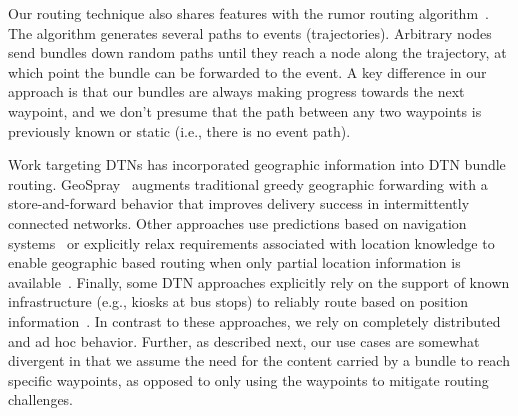 Our routing technique also shares features with the rumor routing algorithm~\cite{braginsky02:RRA}. The algorithm generates several paths to events (trajectories). Arbitrary nodes send bundles down random paths until they reach a node along the trajectory, at which point the bundle can be forwarded to the event. A key difference in our approach is that our bundles are always making progress towards the next waypoint, and we don't presume that the path between any two waypoints is previously known or static (i.e., there is no event path).

Work targeting DTNs has incorporated geographic information into DTN bundle routing. GeoSpray~\cite{soares14:geospray} augments traditional greedy geographic forwarding with a store-and-forward behavior that improves delivery success in intermittently connected networks. Other approaches use predictions based on navigation systems~\cite{cheng10:geodtn} or explicitly relax requirements associated with location knowledge to enable geographic based routing when only partial location information is available~\cite{kuiper11:geographical}. Finally, some DTN approaches explicitly rely on the support of known infrastructure (e.g., kiosks at bus stops) to reliably route based on position information~\cite{park12:position}. In contrast to these approaches, we rely on completely distributed and ad hoc behavior. Further, as described next, our use cases are somewhat divergent in that we assume the need for the content carried by a bundle to reach specific waypoints, as opposed to only using the waypoints to mitigate routing challenges.
